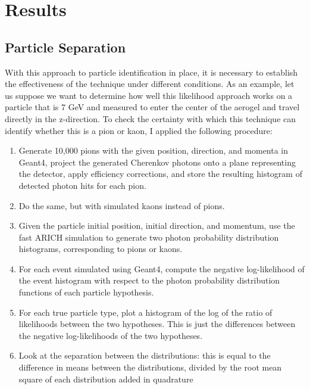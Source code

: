 
\chapter{Results}
\label{ch:Results}



\section{Particle Separation}
With this approach to particle identification in place, it is necessary to establish the effectiveness of the technique under different conditions.
As an example, let us suppose we want to determine how well this likelihood approach works on a particle that is 7 GeV and measured to enter the center of the aerogel and travel directly in the z-direction.
To check the certainty with which this technique can identify whether this is a pion or kaon, I applied the following procedure:

\begin{enumerate}
\item Generate 10,000 pions with the given position, direction, and momenta in Geant4, project the generated Cherenkov photons onto a plane representing the detector, apply efficiency corrections, and store the resulting histogram of detected photon hits for each pion. 
\item Do the same, but with simulated kaons instead of pions.
\item Given the particle initial position, initial direction, and momentum, use the fast ARICH simulation to generate two photon probability distribution histograms, corresponding to pions or kaons.
\item For each event simulated using Geant4, compute the negative log-likelihood of the event histogram with respect to the photon probability distribution functions of each particle hypothesis.
\item For each true particle type, plot a histogram of the log of the ratio of likelihoods between the two hypotheses.
This is just the differences between the negative log-likelihoods of the two hypotheses.
\item Look at the separation between the distributions: this is equal to the difference in means between the distributions, divided by the root mean square of each distribution added in quadrature
\end{enumerate}

